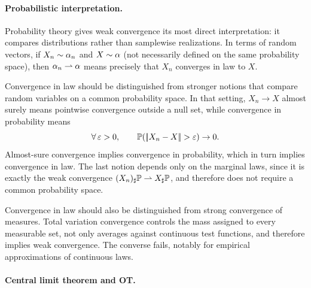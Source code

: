 \paragraph{Probabilistic interpretation.}

Probability theory gives weak convergence its most direct interpretation: it compares distributions rather than samplewise realizations. In terms of random vectors, if $X_n \sim \alpha_n$ and $X \sim \alpha$ (not necessarily defined on the same probability space), then $\alpha_n\rightharpoonup\alpha$ means precisely that $X_n$ converges in law to $X$.

Convergence in law should be distinguished from stronger notions that compare random variables on a common probability space. In that setting, $X_n\to X$ almost surely means pointwise convergence outside a null set, while convergence in probability means
\[
	\foralls \epsilon>0,\qquad
	\PP(\norm{X_n-X}>\epsilon)\to0.
\]
Almost-sure convergence implies convergence in probability, which in turn implies convergence in law. The last notion depends only on the marginal laws, since it is exactly the weak convergence $(X_n)_\sharp\mathbb{P}\rightharpoonup X_\sharp\mathbb{P}$, and therefore does not require a common probability space.

Convergence in law should also be distinguished from strong convergence of measures. Total variation convergence controls the mass assigned to every measurable set, not only averages against continuous test functions, and therefore implies weak convergence. The converse fails, notably for empirical approximations of continuous laws.

\paragraph{Central limit theorem and OT.}

